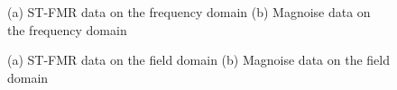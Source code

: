 \begin{figure}[!ht]
\centering
{}
\caption{(a) ST-FMR data on the frequency domain (b) Magnoise data on the frequency domain}
\end{figure}




\begin{figure}[!ht]
\centering
{}
\caption{(a) ST-FMR data on the field domain (b) Magnoise data on the field domain}
\end{figure}






